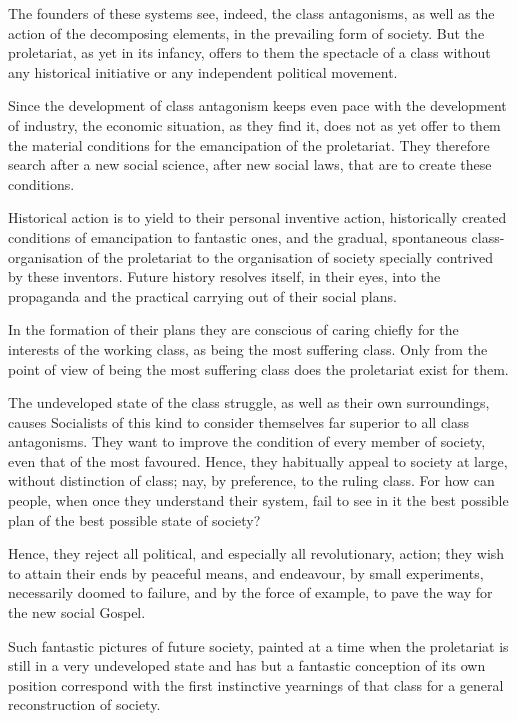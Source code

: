 The founders of these systems see, indeed, the class antagonisms, as
well as the action of the decomposing elements, in the prevailing form
of society. But the proletariat, as yet in its infancy, offers to them
the spectacle of a class without any historical initiative or any
independent political movement.

Since the development of class antagonism keeps even pace with the
development of industry, the economic situation, as they find it, does
not as yet offer to them the material conditions for the emancipation
of the proletariat. They therefore search after a new social science,
after new social laws, that are to create these conditions.

Historical action is to yield to their personal inventive action,
historically created conditions of emancipation to fantastic ones, and
the gradual, spontaneous class-organisation of the proletariat to the
organisation of society specially contrived by these inventors. Future
history resolves itself, in their eyes, into the propaganda and the
practical carrying out of their social plans.

In the formation of their plans they are conscious of caring chiefly
for the interests of the working class, as being the most suffering
class. Only from the point of view of being the most suffering class
does the proletariat exist for them.

The undeveloped state of the class struggle, as well as their own
surroundings, causes Socialists of this kind to consider themselves far
superior to all class antagonisms. They want to improve the condition
of every member of society, even that of the most favoured. Hence, they
habitually appeal to society at large, without distinction of class;
nay, by preference, to the ruling class. For how can people, when once
they understand their system, fail to see in it the best possible plan
of the best possible state of society?

Hence, they reject all political, and especially all revolutionary,
action; they wish to attain their ends by peaceful means, and
endeavour, by small experiments, necessarily doomed to failure, and by
the force of example, to pave the way for the new social Gospel.

Such fantastic pictures of future society, painted at a time when the
proletariat is still in a very undeveloped state and has but a
fantastic conception of its own position correspond with the first
instinctive yearnings of that class for a general reconstruction of
society.

